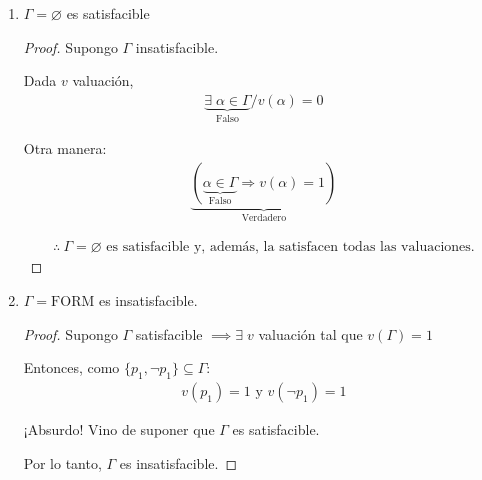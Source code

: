 \begin{enumerate}
\begin{proof}
        \begin{gather*}
            \boxed{\therefore ~ \Gamma \text{ es insatisfacible.}}
        \end{gather*}

        \end{proof}

    \item $\Gamma = \varnothing$ es satisfacible


        \begin{proof} \phantom{.}
            
            Supongo $\Gamma$ insatisfacible.

            Dada $v$ valuación, 
            \begin{gather*}
                \underbrace{\exists \; \alpha \in \Gamma}_{\text{Falso}} / 
                v(\alpha)=0
            \end{gather*}

            Otra manera:
            \begin{gather*}
                \underbrace{(\underbrace{\alpha \in \Gamma}_{\text{Falso}} 
                \Rightarrow v(\alpha)=1)}_{\text{Verdadero}}
            \end{gather*}

            \begin{gather*}
                \boxed{\therefore ~ \Gamma = \varnothing \text{ es 
                satisfacible y, además, la satisfacen todas las 
                valuaciones.}}
            \end{gather*}
                
        \end{proof}

    \item $\Gamma = \mathrm{FORM}$ es insatisfacible.

        \begin{proof} \phantom{.}
            
            Supongo $\Gamma$ satisfacible $\implies \exists \; v$ valuación
            tal que $v(\Gamma)=1$

            Entonces, como $\{ p_1, \neg p_1 \} \subseteq \Gamma$:
            \begin{gather*}
                v(p_1)=1 \text{ y } v(\neg p_1)= 1
            \end{gather*}

            ¡Absurdo! Vino de suponer que $\Gamma$ es satisfacible.

            Por lo tanto, $\Gamma$ es insatisfacible.

        \end{proof}
\end{enumerate}


